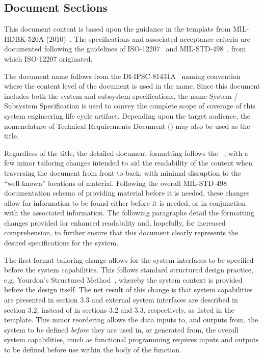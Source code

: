 \subsection{Document Sections}
\label{ssec:Intro_DocSections}

This document content is based upon the guidance in the \TRD template from MIL-HDBK-520A (2010)~\cite{ref__MIL_HDBK_520}.
The specifications and associated acceptance criteria are documented following the guidelines of ISO-12207~\cite{ref__ISO_12207} and MIL-STD-498~\cite{ref__MIL_STD_498}, from which ISO-12207 originated.

The document name follows from the \DID DI-IPSC-81431A~\cite{ref__SSS_DID} naming convention where the content level of the document is used in the name.
Since this document includes both the system and subsystem specifications, the name System / Subsystem Specification is used to convey the complete scope of coverage of this system engineering life cycle artifact.
Depending upon the target audience, the nomenclature of Technical Requirements Document (\TRD) may also be used as the title. 

Regardless of the title, the detailed document formatting follows the \SSS \DID~\cite{ref__SSS_DID}, with a few minor tailoring changes intended to aid the readability of the content when traversing the document from front to back, with minimal disruption to the ``well-known'' locations of material.
Following the overall MIL-STD-498~\cite{ref__MIL_STD_498} documentation schema of providing material before it is needed, these changes allow for information to be found either before it is needed, or in conjunction with the associated information.
The following paragraphs detail the formatting changes provided for enhanced readability and, hopefully, for increased comprehension, to further ensure that this document clearly represents the desired specifications for the system.

The first format tailoring change allows for the system interfaces to be specified before the system capabilities. 
This follows standard structured design practice, e.g. Yourdon's Structured Method~\cite{ref__JESA}, whereby the system context is provided before the design itself.
The net result of this change is that system capabilities are presented in section 3.3 and external system interfaces are described in section 3.2, instead of in sections 3.2 and 3.3, respectively, as listed in the \SSS template.
This minor reordering allows the data inputs to, and outputs from, the system to be defined {\em before} they are used in, or generated from, the overall system capabilities, much as functional programming requires inputs and outputs to be defined before use within the body of the function.

